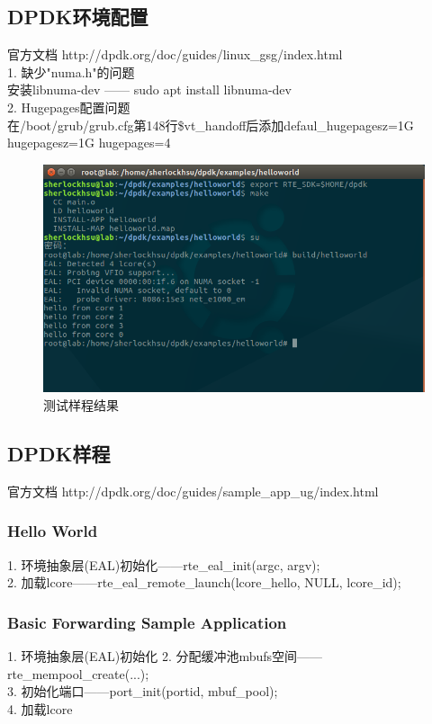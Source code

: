 \documentclass{article}
\begin{document}
\subsection{DPDK环境配置}
官方文档 http://dpdk.org/doc/guides/linux\_gsg/index.html \\
1. 缺少"numa.h"的问题\\
安装libnuma-dev —— sudo apt install libnuma-dev\\
2. Hugepages配置问题\\
在/boot/grub/grub.cfg第148行\$vt\_handoff后添加defaul\_hugepagesz=1G hugepagesz=1G hugepages=4
\begin{figure}[H]
	\centering
	\includegraphics[width = .8\textwidth]{compile.png}
	\caption{测试样程结果}
\end{figure}
\subsection{DPDK样程}
官方文档 http://dpdk.org/doc/guides/sample\_app\_ug/index.html
\subsubsection{Hello World}
1. 环境抽象层(EAL)初始化——rte\_eal\_init(argc, argv);\\
2. 加载lcore——rte\_eal\_remote\_launch(lcore\_hello, NULL, lcore\_id);
\subsubsection{Basic Forwarding Sample Application}
1. 环境抽象层(EAL)初始化
2. 分配缓冲池mbufs空间——rte\_mempool\_create(...);\\
3. 初始化端口——port\_init(portid, mbuf\_pool);\\
4. 加载lcore
\end{document}
